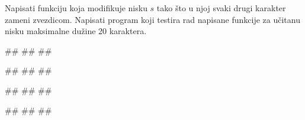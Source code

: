 \begin{Exercise}[label=p2.3_07] 
 Napisati funkciju  koja modifikuje nisku $s$ tako što u njoj svaki drugi karakter zameni zvezdicom. 
Napisati program koji testira rad napisane funkcije za učitanu nisku maksimalne dužine 20 karaktera. 
 
\begin{miditest}
\begin{upotreba}{1}
#\naslovInt#
##
##
\end{upotreba}
\end{miditest}
\begin{miditest}
\begin{upotreba}{2}
#\naslovInt#
##
##
\end{upotreba}
\end{miditest}

\begin{miditest}
\begin{upotreba}{3}
#\naslovInt#
##
##
\end{upotreba}
\end{miditest}
\begin{miditest}
\begin{upotreba}{4}
#\naslovInt#
##
##
\end{upotreba}
\end{miditest}

\end{Exercise}
\ifresenja
\begin{Answer}[ref=p2.3_07]
\end{Answer}
\fi

